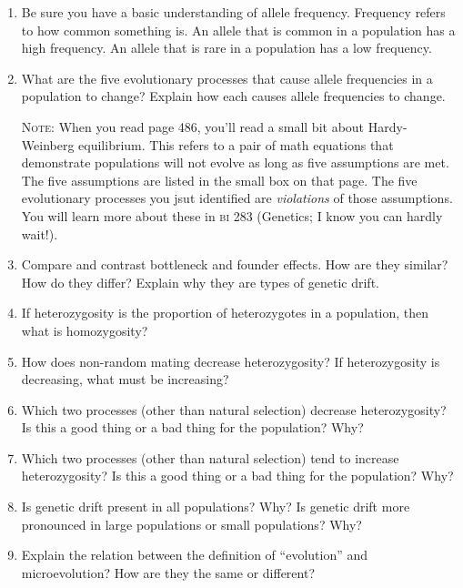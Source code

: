 \documentclass[letterpaper]{tufte-handout}
\begin{document}
\begin{enumerate}

	\item Be sure you have a basic understanding of allele frequency.  Frequency refers to how common something is. An allele that is common in a population has a high frequency. An allele that is rare in a population has a low frequency.
	
	\item What are the five evolutionary processes that cause allele frequencies in a population to change?  Explain how each causes allele frequencies to change.
	
	\textsc{Note:} When you read page 486, you'll read a small bit about Hardy-Weinberg equilibrium. This refers to a pair of math equations that demonstrate populations will not evolve as long as five assumptions are met. The five assumptions are listed in the small box on that page. The five evolutionary processes you jsut identified are \emph{violations} of those assumptions. You will learn more about these in \textsc{bi} 283 (Genetics; I know you can hardly wait!).

	\item Compare and contrast bottleneck and founder effects.  How are they similar?  How do they differ?  Explain why they are types of genetic drift.
		
	\item If heterozygosity is the proportion of heterozygotes in a population, then what is homozygosity?	
	
	\item How does non-random mating decrease heterozygosity? If heterozygosity is decreasing, what must be increasing?

	\item Which two processes (other than natural selection) decrease heterozygosity? Is this a good thing or a bad thing for the population? Why?
	
	\item Which two processes (other than natural selection) tend to increase heterozygosity? Is this a good thing or a bad thing for the population? Why?

	\item Is genetic drift present in all populations? Why? Is genetic drift more pronounced in large populations or small populations?  Why?

	\item Explain the relation between the definition of ``evolution'' and microevolution? How are they the same or different? 
\end{enumerate}
\end{document}
